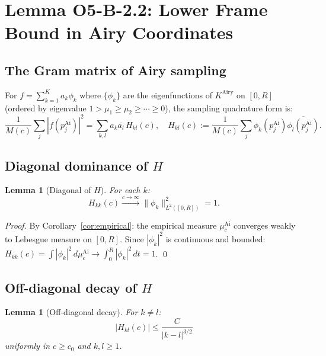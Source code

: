 \documentclass[12pt,a4paper]{amsart}
\newtheorem{lemma}[theorem]{Lemma}
\theoremstyle{definition}
\newcommand{\KAi}{K^{\mathrm{Airy}}}
\newcommand{\norm}[1]{\|#1\|}
\newcommand{\abs}[1]{\left|#1\right|}
\begin{document}
\section{Lemma O5-B-2.2: Lower Frame Bound in Airy Coordinates}
\label{sec:frame}

\subsection{The Gram matrix of Airy sampling}

For $f = \sum_{k=1}^K a_k \phi_k$ where $\{\phi_k\}$ are the
eigenfunctions of $\KAi$ on $[0,R]$ (ordered by eigenvalue
$1 > \mu_1 \ge \mu_2 \ge \cdots \ge 0$), the sampling quadrature form is:
\begin{equation}\label{eq:sampling_expand}
  \frac{1}{M(c)}\sum_j\abs{f(p_j^{\mathrm{Ai}})}^2
  = \sum_{k,l} a_k\overline{a_l}\,H_{kl}(c),
  \quad H_{kl}(c) := \frac{1}{M(c)}\sum_j \phi_k(p_j^{\mathrm{Ai}})\overline{\phi_l(p_j^{\mathrm{Ai}})}.
\end{equation}

\subsection{Diagonal dominance of $H$}

\begin{lemma}[Diagonal of $H$]\label{lem:Hdiag}
For each $k$:
\[
  H_{kk}(c) \xrightarrow{c\to\infty} \norm{\phi_k}_{L^2([0,R])}^2 = 1.
\]
\end{lemma}

\begin{proof}
By Corollary~\ref{cor:empirical}: the empirical measure $\mu_c^{\mathrm{Ai}}$
converges weakly to Lebesgue measure on $[0,R]$.
Since $|\phi_k|^2$ is continuous and bounded:
$H_{kk}(c) = \int |\phi_k|^2\,d\mu_c^{\mathrm{Ai}} \to \int_0^R |\phi_k|^2\,dt = 1$. \qed
\end{proof}

\subsection{Off-diagonal decay of $H$}

\begin{lemma}[Off-diagonal decay]\label{lem:Hoffdiag}
For $k \ne l$:
\[
  \abs{H_{kl}(c)} \le \frac{C}{|k-l|^{3/2}}
\]
uniformly in $c \ge c_0$ and $k, l \ge 1$.
\end{lemma}
\end{document}
